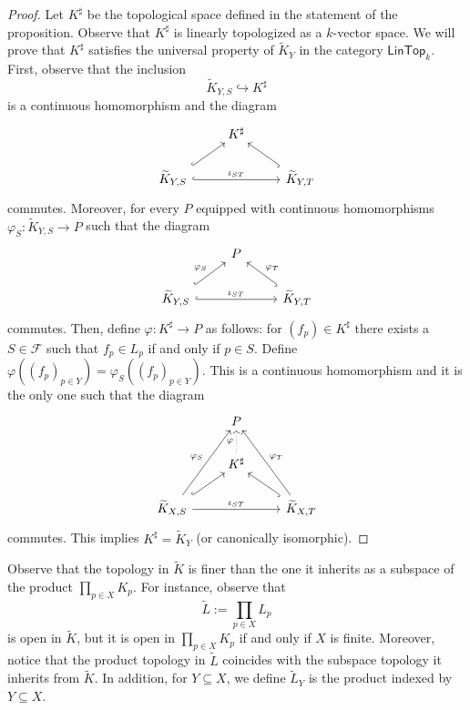 \begin{proof}
	Let $K^{\sharp}$ be the topological space defined in the statement of the proposition. Observe that $K^{\sharp}$ is linearly topologized as a $k$-vector space. We will prove that $K^{\sharp}$ satisfies the universal property of $\widetilde{K}_{Y}$ in the category $\mathsf{LinTop}_{k}$. First, observe that the inclusion
	\[
		\widetilde{K}_{Y,S} \hookrightarrow K^{\sharp}
	\]
	is a continuous homomorphism and the diagram
	\[
		\begin{tikzcd}
			& K^{\sharp} & \\
			\widetilde{K}_{Y,S} \arrow[rr, "\iota_{ST}", hook]\arrow[ur, hook] & & \widetilde{K}_{Y,T} \arrow[lu, hook]
		\end{tikzcd}
	\]
	commutes. Moreover, for every $P$ equipped with continuous homomorphisms $\varphi_{S}\colon \widetilde{K}_{Y,S}\to P$ such that the diagram 
	\[
		\begin{tikzcd}
			& P & \\
			\widetilde{K}_{Y,S} \arrow[rr, "\iota_{ST}", hook]\arrow[ur, hook, "\varphi_{S}"] & & \widetilde{K}_{Y,T} \arrow[lu, hook, "\varphi_{T}", swap]
		\end{tikzcd}
	\]
	commutes. Then, define $\varphi\colon K^{\sharp} \to P$ as follows: for $(f_{p}) \in K^{\sharp}$ there exists a $S\in \mathscr{F}$ such that $f_{p} \in L_{p}$ if and only if $p \in S$. Define $\varphi( (f_{p})_{p\in Y} ) = \varphi_{S}( (f_{p})_{p\in Y} )$. This is a continuous homomorphism and it is the only one such that the diagram
	\[
		\begin{tikzcd}
			& P & \\
			& K^{\sharp} \arrow[u, "\varphi", dotted] & \\
			\widetilde{K}_{X,S} \arrow[rr, "\iota_{ST}"]\arrow[uur, "\varphi_{S}"]\arrow[ur, hook] & & \widetilde{K}_{X,T} \arrow[luu, "\varphi_{T}", swap] \arrow[lu, hook]
		\end{tikzcd}
	\]
	commutes. This implies $K^{\sharp} = \widetilde{K}_{Y}$ (or canonically isomorphic).
\end{proof}
\begin{remark}\label{rem:adèle-not-subspace-topology}
	Observe that the topology in $\widetilde{K}$ is finer than the one it inherits as a subspace of the product $\prod_{p\in X}K_{p}$. For instance, observe that 
	\[
		\widetilde{L} := \prod_{p\in X}L_{p} 
	\] 
	is open in $\widetilde{K}$, but it is open in $\prod_{p\in X} K_{p}$ if and only if $X$ is finite. Moreover, notice that the product topology in $\widetilde{L}$ coincides with the subspace topology it inherits from $\widetilde{K}$. In addition, for $Y\subseteq X$, we define $\widetilde{L}_{Y}$ is the product indexed by $Y \subseteq X$.
\end{remark}
